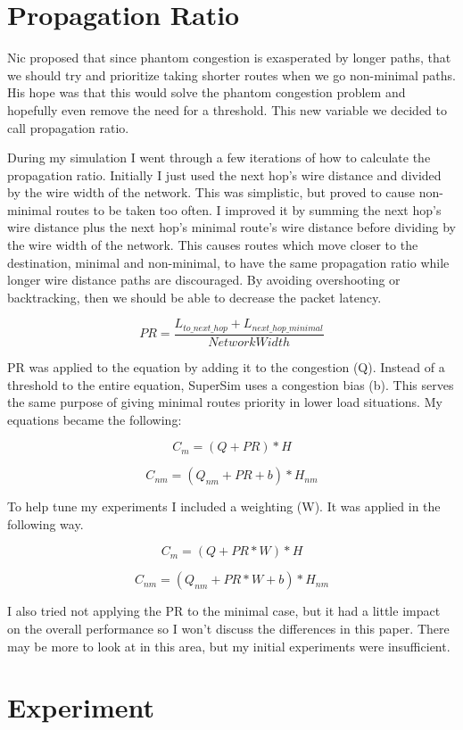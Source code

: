 \documentclass[conference,12pt]{IEEEtran}
\begin{document}
\section{Propagation Ratio}
Nic proposed that since phantom congestion is exasperated by longer paths, that we should try and prioritize taking shorter routes when we go non-minimal paths. His hope was that this would solve the phantom congestion problem and hopefully even remove the need for a threshold. This new variable we decided to call propagation ratio.

During my simulation I went through a few iterations of how to calculate the propagation ratio. Initially I just used the next hop's wire distance and divided by the wire width of the network. This was simplistic, but proved to cause non-minimal routes to be taken too often. I improved it by summing the next hop's wire distance plus the next hop's minimal route's wire distance before dividing by the wire width of the network. This causes routes which move closer to the destination, minimal and non-minimal, to have the same propagation ratio while longer wire distance paths are discouraged. By avoiding overshooting or backtracking, then we should be able to decrease the packet latency.

\[{PR} = \frac{L_{to\_next\_hop} + L_{next\_hop\_minimal}}{{Network Width}}\]

PR was applied to the equation by adding it to the congestion (Q). Instead of a threshold to the entire equation, SuperSim uses a congestion bias (b). This serves the same purpose of giving minimal routes priority in lower load situations. My equations became the following:

\[C_m = (Q + PR) * H\]

\[C_{nm} = (Q_{nm} + PR + b) * H_{nm}\]

To help tune my experiments I included a weighting (W). It was applied in the following way. 

\[C_m = (Q + PR * W) * H\]

\[C_{nm} = (Q_{nm} + PR * W + b) * H_{nm}\]

I also tried not applying the PR to the minimal case, but it had a little impact on the overall performance so I won't discuss the differences in this paper. There may be more to look at in this area, but my initial experiments were insufficient.

\section{Experiment}
\end{document}
